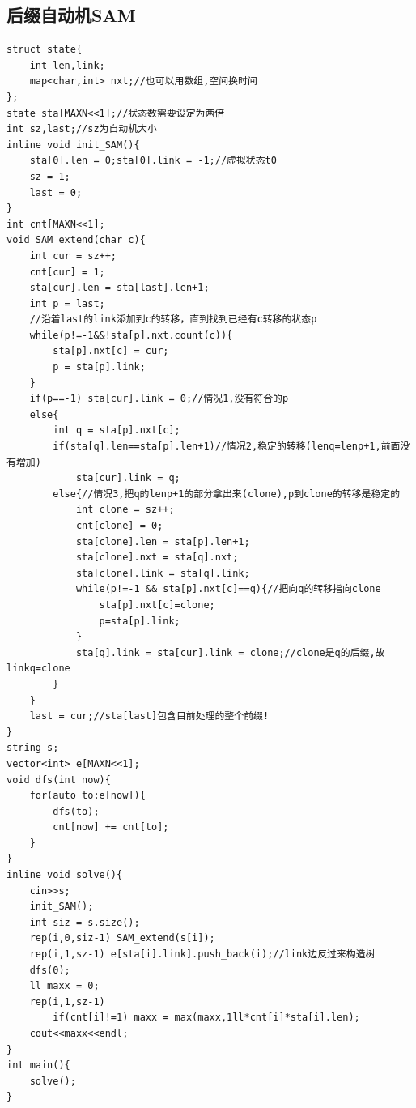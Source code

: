 \documentclass[a4]{ctexart}
\begin{document}
\subsection{后缀自动机SAM}
\begin{lstlisting}
struct state{
    int len,link;
    map<char,int> nxt;//也可以用数组,空间换时间
};
state sta[MAXN<<1];//状态数需要设定为两倍
int sz,last;//sz为自动机大小
inline void init_SAM(){
    sta[0].len = 0;sta[0].link = -1;//虚拟状态t0
    sz = 1;
    last = 0;
}
int cnt[MAXN<<1];
void SAM_extend(char c){
    int cur = sz++;
    cnt[cur] = 1;
    sta[cur].len = sta[last].len+1;
    int p = last;
    //沿着last的link添加到c的转移，直到找到已经有c转移的状态p
    while(p!=-1&&!sta[p].nxt.count(c)){
        sta[p].nxt[c] = cur;
        p = sta[p].link;
    }
    if(p==-1) sta[cur].link = 0;//情况1,没有符合的p
    else{
        int q = sta[p].nxt[c];
        if(sta[q].len==sta[p].len+1)//情况2,稳定的转移(lenq=lenp+1,前面没有增加)
            sta[cur].link = q;
        else{//情况3,把q的lenp+1的部分拿出来(clone),p到clone的转移是稳定的
            int clone = sz++;
            cnt[clone] = 0;
            sta[clone].len = sta[p].len+1;
            sta[clone].nxt = sta[q].nxt;
            sta[clone].link = sta[q].link;
            while(p!=-1 && sta[p].nxt[c]==q){//把向q的转移指向clone
                sta[p].nxt[c]=clone;
                p=sta[p].link;
            }
            sta[q].link = sta[cur].link = clone;//clone是q的后缀,故linkq=clone
        }
    }
    last = cur;//sta[last]包含目前处理的整个前缀!
}
string s;
vector<int> e[MAXN<<1];
void dfs(int now){
    for(auto to:e[now]){
        dfs(to);
        cnt[now] += cnt[to];
    }
}
inline void solve(){
    cin>>s;
    init_SAM();
    int siz = s.size();
    rep(i,0,siz-1) SAM_extend(s[i]);
    rep(i,1,sz-1) e[sta[i].link].push_back(i);//link边反过来构造树
    dfs(0);
    ll maxx = 0;
    rep(i,1,sz-1)
        if(cnt[i]!=1) maxx = max(maxx,1ll*cnt[i]*sta[i].len);
    cout<<maxx<<endl;
}
int main(){
    solve();    
}
\end{lstlisting}
\end{document}
